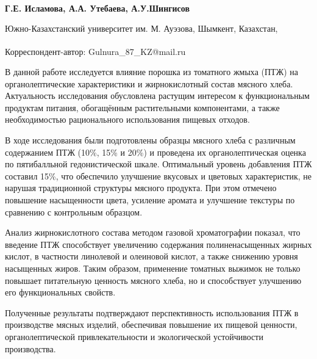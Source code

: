 
\begin{articleheader}

{\bfseries
Г.Е. Исламова\textsuperscript{\envelope },
А.А. Утебаева,
А.У.Шингисов
}
\end{articleheader}

\begin{affiliation}
Южно-Казахстанский университет им. М. Ауэзова, Шымкент, Казахстан,

\raggedright \textsuperscript{\envelope }Корреспондент-автор: Gulnura\_87\_KZ@mail.ru
\end{affiliation}

В данной работе исследуется влияние порошка из томатного жмыха (ПТЖ) на
органолептические характеристики и жирнокислотный состав мясного хлеба.
Актуальность исследования обусловлена растущим интересом к
функциональным продуктам питания, обогащённым растительными
компонентами, а также необходимостью рационального использования пищевых
отходов.

В ходе исследования были подготовлены образцы мясного хлеба с различным
содержанием ПТЖ (10\%, 15\% и 20\%) и проведена их органолептическая
оценка по пятибалльной гедонистической шкале. Оптимальный уровень
добавления ПТЖ составил 15\%, что обеспечило улучшение вкусовых и
цветовых характеристик, не нарушая традиционной структуры мясного
продукта. При этом отмечено повышение насыщенности цвета, усиление
аромата и улучшение текстуры по сравнению с контрольным образцом.

Анализ жирнокислотного состава методом газовой хроматографии показал,
что введение ПТЖ способствует увеличению содержания полиненасыщенных
жирных кислот, в частности линолевой и олеиновой кислот, а также
снижению уровня насыщенных жиров. Таким образом, применение томатных
выжимок не только повышает питательную ценность мясного хлеба, но и
способствует улучшению его функциональных свойств.

Полученные результаты подтверждают перспективность использования ПТЖ в
производстве мясных изделий, обеспечивая повышение их пищевой ценности,
органолептической привлекательности и экологической устойчивости
производства.

